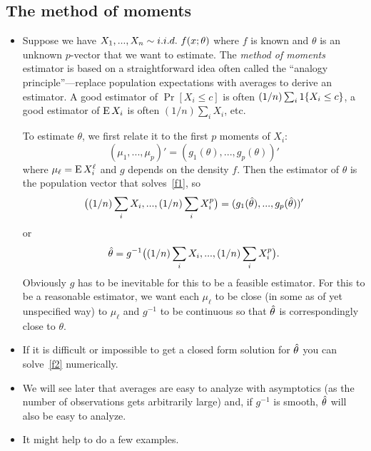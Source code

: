 \subsection{The method of moments}

\begin{itemize}
\item Suppose we have $X_1,...,X_n \sim \iid\ f(x; \theta)$ where $f$ is known
  and $\theta$ is an unknown $p$-vector that we want to estimate.  The
  \emph{method of moments} estimator is based on a straightforward
  idea often called the ``analogy principle''---replace population
  expectations with averages to derive an estimator.  A good estimator
  of $\Pr[X_i \leq c]$ is often $(1/n) \sum_i \operatorname{1}\{X_i \leq c\}$, a good
  estimator of $\operatorname{E} X_i$ is often $(1/n) \sum_i X_i$, etc.

  To estimate $\theta$, we first relate it to the first $p$ moments of
  $X_i$:
  \begin{equation}\label{f1}
    (\mu_1,...,\mu_p)' = (g_1(\theta),...,g_p(\theta))'
  \end{equation}
  where $\mu_\ell = \operatorname{E} X_i^\ell$ and $g$ depends on the density $f$.  Then the
  estimator of $\theta$ is the population vector that solves~\eqref{f1},
  so
  \begin{equation}\label{f2}
    \big((1/n) \sum_i X_i,...,(1/n) \sum_i X_i^p\big)
    = (g_1(\thetah),...,g_p(\thetah))'
  \end{equation}
  or
  \begin{equation*}
    \hat{\theta} = g^{-1}\big((1/n) \sum_i X_i,...,(1/n) \sum_i X_i^p\big).
  \end{equation*}
  Obviously $g$ has to be inevitable for this to be a feasible
  estimator.  For this to be a reasonable estimator, we want each
  $\mu_\ell$ to be close (in some as of yet unspecified way) to $\mu_\ell$ and
  $g^{-1}$ to be continuous so that $\hat{\theta}$ is correspondingly close to
  $\theta$.

\item If it is difficult or impossible to get a closed form solution
  for $\hat{\theta}$ you can solve~\eqref{f2} numerically.

\item We will see later that averages are easy to analyze with
  asymptotics (as the number of observations gets arbitrarily large)
  and, if $g^{-1}$ is smooth, $\hat{\theta}$ will also be easy to analyze.

\item It might help to do a few examples.


\end{itemize}
